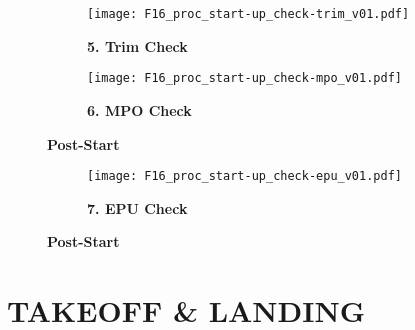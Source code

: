 \begin{figure}[h]
    \centering
    \begin{subfigure}[t]{0.45\linewidth}
        \centering
        \texttt{[image: F16\_proc\_start-up\_check-trim\_v01.pdf]}
        \caption*{\textbf{5. Trim Check}}
    \end{subfigure}
    \begin{subfigure}[t]{0.45\linewidth}
        \centering
        \texttt{[image: F16\_proc\_start-up\_check-mpo\_v01.pdf]}
        \caption*{\textbf{6. MPO Check}}
    \end{subfigure}
    \caption{\textbf{Post-Start}}
    \label{fig:proc:testschecks3}
\end{figure}

\clearpage

\begin{tcolorenumerate}[resume]
\end{tcolorenumerate}

\begin{figure}[h]
    \centering
    \begin{subfigure}[t]{0.45\linewidth}
        \centering
        \texttt{[image: F16\_proc\_start-up\_check-epu\_v01.pdf]}
        \caption*{\textbf{7. EPU Check}}
    \end{subfigure}
    \caption{\textbf{Post-Start}}
    \label{fig:proc:testschecks4}
\end{figure}

\clearpage

\section{TAKEOFF \& LANDING}



\cleardoublepage